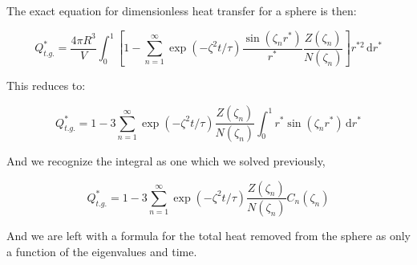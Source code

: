 The exact equation for dimensionless heat transfer for a sphere is then:

\begin{equation}
    Q^*_{t.g.}=\frac{4\pi R^3}{V}\int_0^1  \left[ 1 -\sum_{n=1}^\infty \exp(-\zeta^2 t/\tau) \frac{\sin(\zeta_n r^*)}{r^*}\frac{Z(\zeta_n)}{N(\zeta_n)} \right] r^{*2}\,\mathrm{d}r^*
\end{equation}

This reduces to:

\begin{equation}
    Q^*_{t.g.}=1 - 3\sum_{n=1}^\infty \exp(-\zeta^2 t/\tau) \frac{Z(\zeta_n)}{N(\zeta_n)} \int_0^1 r^* \sin(\zeta_n r^*)\,\mathrm{d}r^* 
\end{equation}

And we recognize the integral as one which we solved previously,

\begin{equation}
\label{eq:qexact}
    Q^*_{t.g.}=1 - 3\sum_{n=1}^\infty \exp(-\zeta^2 t/\tau) \frac{Z(\zeta_n)}{N(\zeta_n)} C_n(\zeta_n)
\end{equation}

And we are left with a formula for the total heat removed from the sphere as only a function of the eigenvalues and time.

